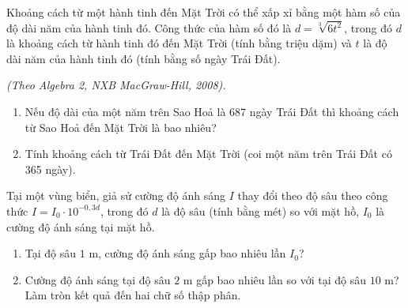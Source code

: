 \begin{bt}%
	Khoảng cách từ một hành tinh đến Mặt Trời có thể xấp xỉ bằng một hàm số của độ dài năm của hành tinh đó. Công thức của hàm số đó là $d=\sqrt[3]{6 t^2}$, trong đó $d$ là khoảng cách từ hành tinh đó đến Mặt Trời (tính bằng triệu dặm) và $t$ là độ dài năm của hành tinh đó (tính bằng số ngày Trái Đất).\\
	\begin{flushright}
		\textit{(Theo Algebra 2, NXB MacGraw-Hill, 2008).}
	\end{flushright}
	\begin{enumerate}
		\item  Nếu độ dài của một năm trên Sao Hoả là 687 ngày Trái Đất thì khoảng cách từ Sao Hoả đến Mặt Trời là bao nhiêu?
		\item  Tính khoảng cách từ Trái Đất đến Mặt Trời (coi một năm trên Trái Đất có 365 ngày).
	\end{enumerate}
\end{bt} 

\begin{bt}
	Tại một vùng biển, giả sử cường độ ánh sáng $I$ thay đổi theo độ sâu theo công thức $I=I_0 \cdot 10^{-0,3d}$, trong đó $d$ là độ sâu (tính bằng mét) so với mặt hồ, $I_0$ là cường độ ánh sáng tại mặt hồ.
	\begin{enumerate}
		\item Tại độ sâu $1$ m, cường độ ánh sáng gấp bao nhiêu lần $I_0$?
		\item Cường độ ánh sáng tại độ sâu $2$ m gấp bao nhiêu lần so với tại độ sâu $10$ m? Làm tròn kết quả đến hai chữ số thập phân.
	\end{enumerate}
\end{bt} 
